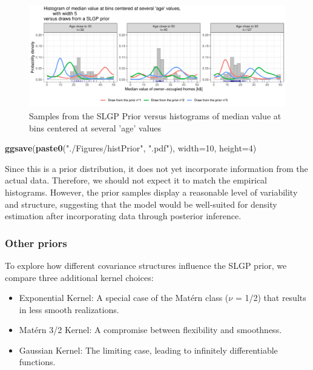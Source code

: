 \documentclass[
]{article}
\newenvironment{Shaded}{\begin{snugshade}}{\end{snugshade}}
\newcommand{\AttributeTok}[1]{\textcolor[rgb]{0.13,0.29,0.53}{#1}}
\newcommand{\DecValTok}[1]{\textcolor[rgb]{0.00,0.00,0.81}{#1}}
\newcommand{\FunctionTok}[1]{\textcolor[rgb]{0.13,0.29,0.53}{\textbf{#1}}}
\newcommand{\NormalTok}[1]{#1}
\newcommand{\StringTok}[1]{\textcolor[rgb]{0.31,0.60,0.02}{#1}}
\providecommand{\tightlist}{%
  \setlength{\itemsep}{0pt}\setlength{\parskip}{0pt}}
\begin{document}
\begin{figure}[H]

{\centering \includegraphics{IntroductionSLGP_files/figure-latex/SLGPplottingPrior2-1} 

}

\caption{Samples from the SLGP Prior versus histograms of median value at bins centered at several 'age' values}\label{fig:SLGPplottingPrior2}
\end{figure}

\begin{Shaded}
\begin{Highlighting}[]

\FunctionTok{ggsave}\NormalTok{(}\FunctionTok{paste0}\NormalTok{(}\StringTok{"./Figures/histPrior"}\NormalTok{,  }\StringTok{".pdf"}\NormalTok{), }\AttributeTok{width=}\DecValTok{10}\NormalTok{, }\AttributeTok{height=}\DecValTok{4}\NormalTok{)}
\end{Highlighting}
\end{Shaded}

Since this is a prior distribution, it does not yet incorporate information from the actual data. Therefore, we should not expect it to match the empirical histograms. However, the prior samples display a reasonable level of variability and structure, suggesting that the model would be well-suited for density estimation after incorporating data through posterior inference.

\subsubsection{Other priors}\label{other-priors}

To explore how different covariance structures influence the SLGP prior, we compare three additional kernel choices:

\begin{itemize}
\tightlist
\item
  Exponential Kernel: A special case of the Matérn class (\(\nu\) = 1/2) that results in less smooth realizations.
\item
  Matérn 3/2 Kernel: A compromise between flexibility and smoothness.
\item
  Gaussian Kernel: The limiting case, leading to infinitely differentiable functions.
\end{itemize}
\end{document}
